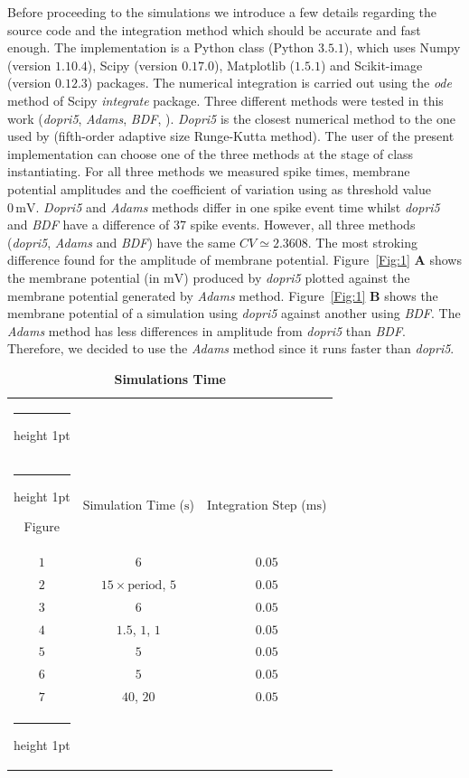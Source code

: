 \documentclass[10pt,a4paper,onecolumn]{article}
\makeatletter
\newcommand{\Rm}[1]{\mathrm{#1}}
\newcommand{\thickhline}{%
    \noalign {\ifnum 0=`}\fi \hrule height 1pt
    \futurelet \reserved@a \@xhline
}
\makeatother
\begin{document}
Before proceeding to the simulations we introduce a few details regarding 
the source code and the integration method which should be accurate and fast
enough. The implementation is a Python class (Python $3.5.1$), which uses
Numpy (version $1.10.4$), Scipy (version $0.17.0$), Matplotlib
($1.5.1$) and Scikit-image (version $0.12.3$) packages. The numerical
integration is carried out using the \emph{ode} method of Scipy 
\emph{integrate} package. Three different methods were tested in this work 
(\emph{dopri5}, \emph{Adams}, \emph{BDF}, \cite{ascher:1998}). \emph{Dopri5}
is the closest numerical method to the one used by \cite{wang:1994}
(fifth-order adaptive size Runge-Kutta method). The user of the present 
implementation can choose one of the three methods at the stage of class
instantiating. For all three methods we measured spike times, membrane
potential amplitudes and the coefficient of variation using as threshold value
$0\, \Rm{mV}$. \emph{Dopri5} and \emph{Adams} methods differ in one spike 
event time whilst \emph{dopri5} and \emph{BDF} have a difference of 37 spike
events. However, all three methods (\emph{dopri5}, \emph{Adams} and \emph{BDF})
have the same $CV \simeq 2.3608$. The most stroking difference found for the
amplitude of membrane potential. Figure~\ref{Fig:1} {\bfseries \sffamily A}
shows the membrane potential (in $\Rm{mV}$) produced by \emph{dopri5} plotted 
against the membrane potential generated by \emph{Adams} method.
Figure~\ref{Fig:1} {\bfseries \sffamily B} shows the membrane potential
of a simulation using \emph{dopri5} against another using \emph{BDF}. The 
\emph{Adams} method has less differences in amplitude from \emph{dopri5} 
than \emph{BDF}. Therefore, we decided to use the \emph{Adams} method 
since it runs faster than \emph{dopri5}. 
\begin{table}[!htbp]
    \centering
    \begin{tabular}{ccc}
        \thickhline
        \multicolumn{3}{c}{Simulated Time} \\ \thickhline
        Figure & Simulation Time ($\Rm{s}$) & Integration Step ($\Rm{ms}$) \\ 
        \rowcolor{LightGray}
        $1$ & $6$ & $0.05$ \\ \rowcolor{Gray}
        $2$ & $15\times \text{period}$, $5$ & $0.05$ \\ \rowcolor{LightGray}
        $3$ & $6$ & $0.05$ \\ \rowcolor{Gray} 
        $4$ & $1.5$, $1$, $1$ & $0.05$ \\ \rowcolor{LightGray} 
        $5$ & $5$ & $0.05$  \\ \rowcolor{Gray} 
        $6$ & $5$ & $0.05$  \\ \rowcolor{LightGray} 
        $7$ & $40$, $20$ & $0.05$  \\ \thickhline
    \end{tabular}
    \caption{{\bfseries \sffamily Simulations Time}}
    \label{Table:2}
\end{table}
\end{document}

